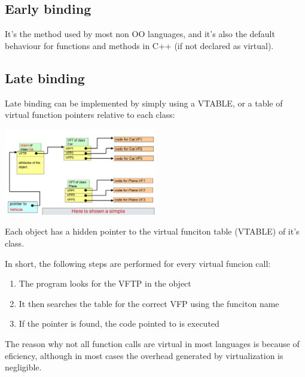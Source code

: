 \subsection{Early binding}

It's the method used by most non OO languages, and it's also the default behaviour for functions and methods in C++ (if not declared as virtual). 

\subsection{Late binding}

Late binding can be implemented by simply using a VTABLE, or a table of virtual function pointers relative to each class:

\includegraphics[width=0.5\textwidth]{img/implLateBinding.png}

Each object has a hidden pointer to the virtual funciton table (VTABLE) of it's class.

In short, the following steps are performed for every virtual funcion call:
\begin{enumerate}
    \item The program looks for the VFTP in the object
    \item It then searches the table for the correct VFP using the funciton name
    \item If the pointer is found, the code pointed to is executed
\end{enumerate}

The reason why not all function calls are virtual in most languages is because of eficiency, although in most cases the overhead generated by virtualization is negligible.

